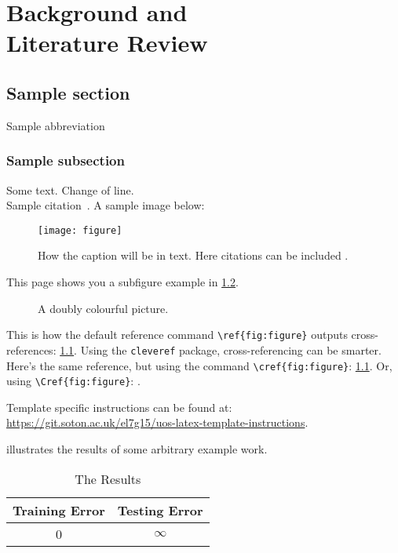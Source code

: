 \documentclass[../main/Progress.tex]{subfiles}
\begin{document}
	\chapter[Background and Literature Review]{Background and \\Literature Review}
	
	\section{Sample section}
	Sample abbreviation 
	\subsection{Sample subsection}
	Some text. 
	Change of line.\\
	Sample citation~\cite{Fiat:1987}. 
	A sample image below:
	\begin{figure}[h]
		\centering
		\texttt{[image: figure]}
		\caption[How the caption will appear in the list of figures]{How the caption will be in text. Here citations can be included \cite{Fiat:1987}.}
		\label{fig:figure}
	\end{figure}
	
This page shows you a subfigure example in \cref{fig:figsubex}.
\begin{figure}[!htb]
  \centering
  \caption{A doubly colourful picture.}
  \label{fig:figsubex}
\end{figure}


This is how the default reference command \verb|\ref{fig:figure}| outputs cross-references: \ref{fig:figure}.
Using the \verb|cleveref| package, cross-referencing can be smarter. 
Here's the same reference, but using the command \verb|\cref{fig:figure}|: \cref{fig:figure}.
Or, using \verb|\Cref{fig:figure}|: .

Template specific instructions can be found at:
\url{https://git.soton.ac.uk/el7g15/uos-latex-template-instructions}.

 illustrates the results of some arbitrary example work.
\begin{table}[!htb]
  \centering
  \begin{tabular}{cc}
  \toprule
  \textbf{Training Error} & \textbf{Testing Error}\\
  \midrule
  0 & $\infty$\\
  \bottomrule
  \end{tabular}
  \caption{The Results}
  \label{Table:tabex}
\end{table}
\end{document}
